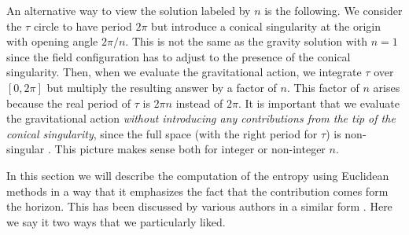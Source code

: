 An alternative way to view the solution labeled by $n$ is the following.
 We consider the $\tau$ circle to have period $2\pi$  but introduce a
conical singularity at the origin with opening angle $2\pi/n$. This is not the same as the gravity solution with
$n=1$ since the field configuration has to adjust to the presence of the conical singularity.
Then, when we evaluate the gravitational
action, we integrate  $\tau$ over $[0,2\pi]$  but multiply the resulting answer by a factor of $n$.
 This factor of $n$ arises because the real period of $\tau$ is $2\pi n$ instead of $2\pi$. It is important
 that we evaluate the gravitational action
{\it without introducing any contributions from the tip of the conical singularity}, since the full space
(with the right period for $\tau$) is non-singular    . This picture makes sense both
 for integer or non-integer $n$.









In this section we will describe the computation of the entropy using Euclidean methods in a way
that it emphasizes the fact that the contribution comes form the horizon. This has been discussed by various
authors in a similar form
.
 Here we say it two  ways  that we particularly liked.


 \ifig{} {}

